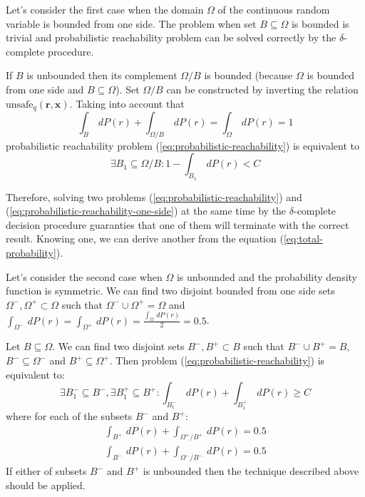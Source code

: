 \begin{IEEEproof}
Let's consider the first case when the domain $\Omega$ of the continuous random variable is bounded from one side. The problem when set $B \subseteq \Omega$ is bounded is trivial and probabilistic reachability problem can be solved correctly by the $\delta$-complete procedure.

If $B$ is unbounded then its complement $\Omega/B$ is bounded (because $\Omega$ is bounded from one side and $B \subseteq \Omega$). Set $\Omega/B$ can be constructed by inverting the relation $\text{unsafe}_{q}(\textbf{r},\textbf{x})$. Taking into account that
\begin{equation} \label{eq:total-probability}
\int_{B} \,dP(r) + \int_{\Omega/B} \,dP(r) = \int_{\Omega} \,dP(r) = 1
\end{equation}
probabilistic reachability problem (\ref{eq:probabilistic-reachability}) is equivalent to
\begin{equation} \label{eq:probabilistic-reachability-one-side}
\exists B_1 \subseteq  \Omega/B: 1 - \int_{B_1} \,dP(r) < C
\end{equation}

Therefore, solving two problems (\ref{eq:probabilistic-reachability}) and (\ref{eq:probabilistic-reachability-one-side}) at the same time by the $\delta$-complete decision procedure guaranties that one of them will terminate with the correct result. Knowing one, we can derive another from the equation (\ref{eq:total-probability}).

Let's consider the second case when $\Omega$ is unbounded and the probability density function is symmetric. We can find two disjoint bounded from one side sets $\Omega^{-}, \Omega^{+} \subset \Omega$ such that $\Omega^{-} \cup \Omega^{+} = \Omega$ and $\int_{\Omega^{-}} \,dP(r) = \int_{\Omega^{+}} \,dP(r) = \frac{\int_{\Omega} \,dP(r)}{2} = 0.5$.

Let $B \subseteq \Omega$. We can find two disjoint sets $B^{-}, B^{+} \subset B$ such that $B^{-} \cup B^{+} = B$, $B^{-} \subseteq \Omega^{-}$ and $B^{+} \subseteq \Omega^{+}$. Then problem (\ref{eq:probabilistic-reachability}) is equivalent to:
\begin{equation} \label{eq:probabilistic-reachability-symmetric}
\exists B_{1}^{-} \subseteq  B^{-}, \exists B_{1}^{+} \subseteq  B^{+} : \int_{B_{1}^{-}} \,dP(r) + \int_{B_{1}^{+}} \,dP(r) \ge C
\end{equation}
where for each of the subsets $B^{-}$ and $B^{+}$:
\begin{equation}
\begin{split}
\int_{B^{+}} \,dP(r) + \int_{\Omega^{+}/B^{+}} \,dP(r)  = 0.5 \\
\int_{B^{-}} \,dP(r) + \int_{\Omega^{-}/B^{-}} \,dP(r)  = 0.5
\end{split}
\end{equation}
If either of subsets $B^{-}$ and $B^{+}$ is unbounded then the technique described above should 
be applied.
\end{IEEEproof}

